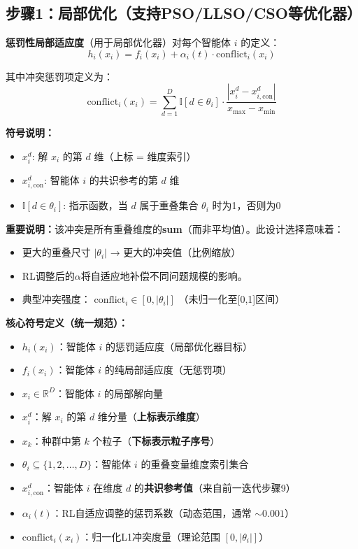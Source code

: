\documentclass[11pt,a3paper]{ctexart}
\begin{document}
\subsection{步骤1：局部优化（支持PSO/LLSO/CSO等优化器）}
\textbf{惩罚性局部适应度}（用于局部优化器）对每个智能体 $i$ 的定义：
\begin{equation}
h_i(x_i) = f_i(x_i) + \alpha_i(t) \cdot \text{conflict}_i(x_i)
\end{equation}

其中冲突惩罚项定义为：
\begin{equation}
\text{conflict}_i(x_i) = \sum_{d=1}^{D} \mathbb{I}[d \in \theta_i] \cdot \frac{|x_i^d - x_{i,\text{con}}^d|}{x_{\max} - x_{\min}}
\end{equation}

\textbf{符号说明：}
\begin{itemize}
    \item $x_i^d$: 解 $x_i$ 的第 $d$ 维（上标 = 维度索引）
    \item $x_{i,\text{con}}^d$: 智能体 $i$ 的共识参考的第 $d$ 维
    \item $\mathbb{I}[d \in \theta_i]$: 指示函数，当 $d$ 属于重叠集合 $\theta_i$ 时为1，否则为0
\end{itemize}

\textbf{重要说明：}该冲突是所有重叠维度的\textbf{sum}（而非平均值）。此设计选择意味着：
\begin{itemize}
    \item 更大的重叠尺寸 $|\theta_i|$ → 更大的冲突值（比例缩放）
    \item RL调整后的$\alpha$将自适应地补偿不同问题规模的影响。
    \item 典型冲突强度： $\text{conflict}_i \in [0, |\theta_i|]$ （未归一化至[0,1]区间）
\end{itemize}

\textbf{核心符号定义（统一规范）：}
\begin{itemize}
    \item $h_i(x_i)$：智能体 $i$ 的惩罚适应度（局部优化器目标）
    \item $f_i(x_i)$：智能体 $i$ 的纯局部适应度（无惩罚项）
    \item $x_i \in \mathbb{R}^{D}$：智能体 $i$ 的局部解向量
    \item $x_i^d$：解 $x_i$ 的第 $d$ 维分量（\textbf{上标表示维度}）
    \item $x_k$：种群中第 $k$ 个粒子（\textbf{下标表示粒子序号}）
    \item $\theta_i \subseteq \{1, 2, \ldots, D\}$：智能体 $i$ 的重叠变量维度索引集合
    \item $x_{i,\text{con}}^d$：智能体 $i$ 在维度 $d$ 的\textbf{共识参考值}（来自前一迭代步骤9）
    \item $\alpha_i(t)$：RL自适应调整的惩罚系数（动态范围，通常 $\sim 0.001$）
    \item $\text{conflict}_i(x_i)$：归一化L1冲突度量（理论范围 $[0, |\theta_i|]$）
\end{itemize}
\end{document}
